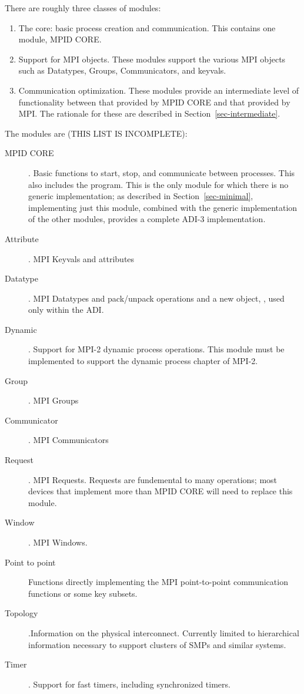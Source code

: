 \documentclass{article}
\begin{document}
There are roughly three classes of modules:
\begin{enumerate}
\item The core: basic process creation and communication. This
contains one module, MPID CORE. 
\item Support for MPI objects.  These modules support the various MPI
objects such as Datatypes, Groups, Communicators, and keyvals.
\item Communication optimization.  These modules provide an
intermediate level of functionality between that provided by MPID CORE
and that provided by MPI.  The rationale for these are described in
Section~\ref{sec-intermediate}. 
\end{enumerate}

The modules are (THIS LIST IS INCOMPLETE):
\begin{description}
\item[MPID CORE]. Basic functions to start, stop, and communicate
between processes.  This also includes the  program.
This is the only module for which there is no generic implementation; as
described in Section~\ref{sec-minimal}, implementing just this module,
combined with the generic implementation of the other modules, provides a
complete ADI-3 implementation.
\item[Attribute]. MPI Keyvals and attributes
\item[Datatype]. MPI Datatypes and pack/unpack operations and a new
object, , used only within the ADI.
\item[Dynamic]. Support for MPI-2 dynamic process operations.  This
module must be implemented to support the dynamic process chapter of MPI-2.
\item[Group]. MPI Groups
\item[Communicator]. MPI Communicators
\item[Request]. MPI Requests.  Requests are fundemental to many
operations; most devices that implement more than MPID CORE will need
to replace this module.
\item[Window]. MPI Windows.
\item[Point to point]Functions directly implementing the MPI
point-to-point communication functions or some key subsets.
\item[Topology].Information on the physical interconnect.  Currently
limited to hierarchical information necessary to support clusters of
SMPs and similar systems.
\item[Timer]. Support for fast timers, including synchronized timers.

\end{description}
\end{document}
